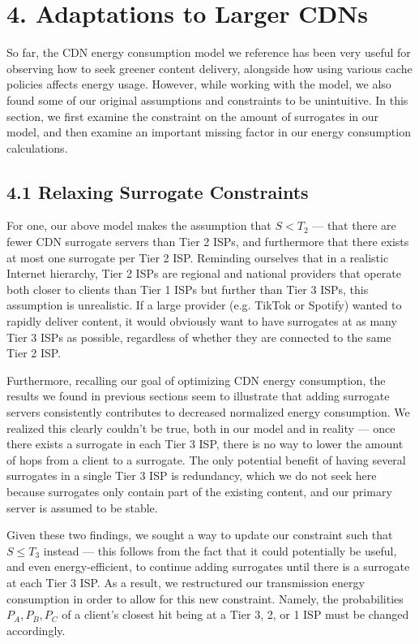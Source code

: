 \documentclass[
	a4paper, %
	10pt, %
	unnumberedsections, %
	twoside, %
]{LTJournalArticle}
\begin{document}
\section{4. Adaptations to Larger CDNs}
So far, the CDN energy consumption model we reference has been very useful for observing how to seek greener content delivery, alongside how using various cache policies affects energy usage. However, while working with the model, we also found some of our original assumptions and constraints to be unintuitive. In this section, we first examine the constraint on the amount of surrogates in our model, and then examine an important missing factor in our energy consumption calculations.

\subsection{4.1 Relaxing Surrogate Constraints}
For one, our above model makes the assumption that $S < T_2$ --- that there are fewer CDN surrogate servers than Tier 2 ISPs, and furthermore that there exists at most one surrogate per Tier 2 ISP. Reminding ourselves that in a realistic Internet hierarchy, Tier 2 ISPs are regional and national providers that operate both closer to clients than Tier 1 ISPs but further than Tier 3 ISPs, this assumption is unrealistic. If a large provider (e.g. TikTok or Spotify) wanted to rapidly deliver content, it would obviously want to have surrogates at as many Tier 3 ISPs as possible, regardless of whether they are connected to the same Tier 2 ISP. 

Furthermore, recalling our goal of optimizing CDN energy consumption, the results we found in previous sections seem to illustrate that adding surrogate servers consistently contributes to decreased normalized energy consumption. We realized this clearly couldn't be true, both in our model and in reality --- once there exists a surrogate in each Tier 3 ISP, there is no way to lower the amount of hops from a client to a surrogate. The only potential benefit of having several surrogates in a single Tier 3 ISP is redundancy, which we do not seek here because surrogates only contain part of the existing content, and our primary server is assumed to be stable. 

Given these two findings, we sought a way to update our constraint such that $S \leq T_3$ instead --- this follows from the fact that it could potentially be useful, and even energy-efficient, to continue adding surrogates until there is a surrogate at each Tier 3 ISP. As a result, we restructured our transmission energy consumption in order to allow for this new constraint. Namely, the probabilities $P_A, P_B, P_C$ of a client's closest hit being at a Tier 3, 2, or 1 ISP must be changed accordingly. 
\end{document}
